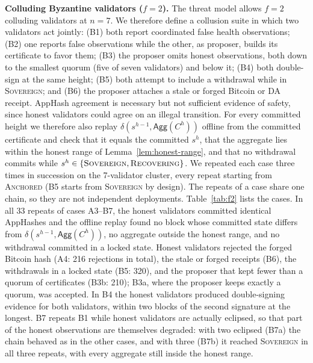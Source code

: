 \textbf{Colluding Byzantine validators ($f{=}2$).} The threat model allows
$f{=}2$ colluding validators at $n{=}7$. We therefore define a collusion
suite in which two validators act jointly: (B1) both report coordinated
false health observations; (B2) one reports false observations while the
other, as proposer, builds its certificate to favor them; (B3) the proposer
omits honest observations, both down to the smallest quorum (five of
seven validators) and below it; (B4) both double-sign at the same height; (B5) both attempt to
include a withdrawal while in \textsc{Sovereign}; and (B6) the proposer
attaches a stale or forged Bitcoin or DA receipt. AppHash agreement is
necessary but not sufficient evidence of safety, since honest validators
could agree on an illegal transition. For every committed height we
therefore also replay $\delta(s^{h-1}, \mathsf{Agg}(C^{h}))$ offline from
the committed certificate and check that it equals the committed $s^{h}$,
that the aggregate lies within the honest range of Lemma~\ref{lem:honest-range}, and that no
withdrawal commits while $s^{h} \in \{\textsc{Sovereign},
\textsc{Recovering}\}$.
We repeated each case three times in succession on the 7-validator cluster, every repeat starting
from \textsc{Anchored} (B5 starts from \textsc{Sovereign} by design). The repeats of a case share one chain, so they are not independent deployments. Table~\ref{tab:f2} lists the cases. In all 33 repeats of
cases A3--B7, the honest validators committed identical AppHashes and
the offline replay found no block whose committed state differs from
$\delta(s^{h-1}, \mathsf{Agg}(C^{h}))$, no aggregate outside the honest
range, and no withdrawal committed in a locked state. Honest validators rejected the
forged Bitcoin hash (A4: 216 rejections in total), the stale or forged receipts (B6),
the withdrawals in a locked state (B5: 320), and the proposer that kept fewer than a quorum of certificates (B3b: 210);
B3a, where the proposer keeps exactly a quorum, was accepted. In B4 the honest
validators produced double-signing evidence for both validators, within two
blocks of the second signature at the longest. B7 repeats B1 while honest validators
are actually eclipsed, so that part of the honest observations are themselves degraded: with two eclipsed (B7a)
the chain behaved as in the other cases, and with three (B7b) it reached
\textsc{Sovereign} in all three repeats, with every aggregate still inside the
honest range.

